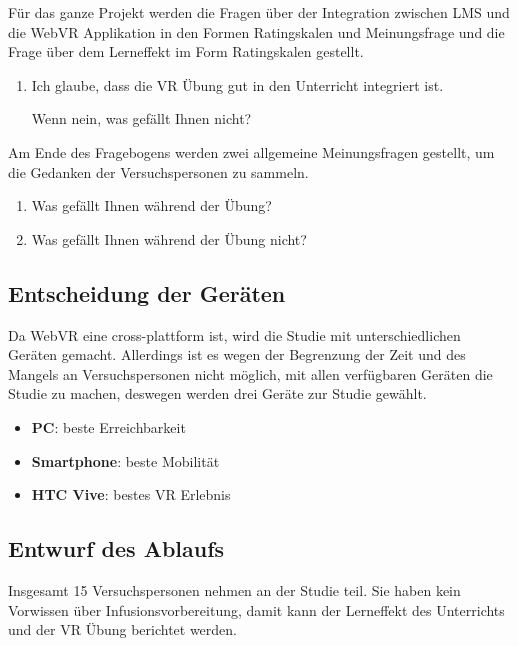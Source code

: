 Für das ganze Projekt werden die Fragen über der Integration zwischen LMS und die WebVR Applikation in den Formen Ratingskalen und Meinungsfrage und die Frage über dem Lerneffekt im Form Ratingskalen gestellt.

\begin{enumerate}
    \item Ich glaube, dass die VR Übung gut in den Unterricht integriert ist.
    
    Wenn nein, was gefällt Ihnen nicht?
%    
\end{enumerate}

Am Ende des Fragebogens werden zwei allgemeine Meinungsfragen gestellt, um die Gedanken der Versuchspersonen zu sammeln.

\begin{enumerate}
    \item Was gefällt Ihnen während der Übung?
    
    \item Was gefällt Ihnen während der Übung nicht?
\end{enumerate}

\subsection{Entscheidung der Geräten}

Da WebVR eine cross-plattform ist, wird die Studie mit unterschiedlichen Geräten gemacht. Allerdings ist es wegen der Begrenzung der Zeit und des Mangels an Versuchspersonen nicht möglich, mit allen verfügbaren Geräten die Studie zu machen, deswegen werden drei Geräte zur Studie gewählt.

\begin{itemize}
    \item \textbf{PC}: beste Erreichbarkeit
    \item \textbf{Smartphone}: beste Mobilität
    \item \textbf{HTC Vive}: bestes VR Erlebnis
\end{itemize}

\subsection{Entwurf des Ablaufs}

Insgesamt 15 Versuchspersonen nehmen an der Studie teil. Sie haben kein Vorwissen über Infusionsvorbereitung, damit kann der Lerneffekt des Unterrichts und der VR Übung berichtet werden.

